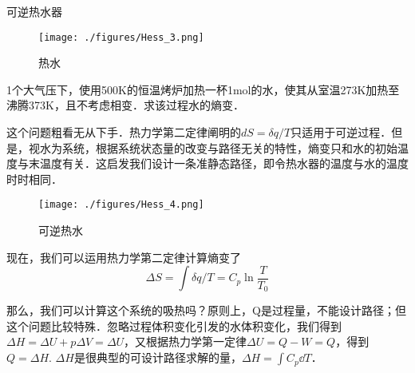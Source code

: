 \begin{example}{可逆热水器}
\begin{figure}[ht]
\centering
\texttt{[image: ./figures/Hess\_3.png]}
\caption{热水} \label{Hess_fig3}
\end{figure}
1个大气压下，使用500K的恒温烤炉加热一杯1mol的水，使其从室温273K加热至沸腾373K，且不考虑相变．求该过程水的熵变．

这个问题粗看无从下手．热力学第二定律阐明的$dS=\delta q/T$只适用于可逆过程．但是，视水为系统，根据系统状态量的改变与路径无关的特性，熵变只和水的初始温度与末温度有关．这启发我们设计一条准静态路径，即令热水器的温度与水的温度时时相同．

\begin{figure}[ht]
\centering
\texttt{[image: ./figures/Hess\_4.png]}
\caption{可逆热水} \label{Hess_fig4}
\end{figure}
现在，我们可以运用热力学第二定律计算熵变了 $$\Delta S=\int \delta q/T=C_p \ln \frac{T}{T_0}$$

那么，我们可以计算这个系统的吸热吗？原则上，Q是过程量，不能设计路径；但这个问题比较特殊．忽略过程体积变化引发的水体积变化，我们得到$\Delta H = \Delta U + p \Delta V= \Delta U$，又根据热力学第一定律$\Delta U=Q-W=Q$，得到 $Q=\Delta H$. $\Delta H$是很典型的可设计路径求解的量，$\Delta H = \int C_p \dd T$．
\end{example}